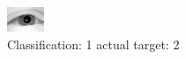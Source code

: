 \begin{figure}[h!]
\begin{center}
\includegraphics[width=0.60\columnwidth]{figures/ID2228_class_1_target_2.png}
\end{center}
\caption{ Classification: 1 actual target: 2}
\label{fig:ID2228_class_1_target_2}
\end{figure}
